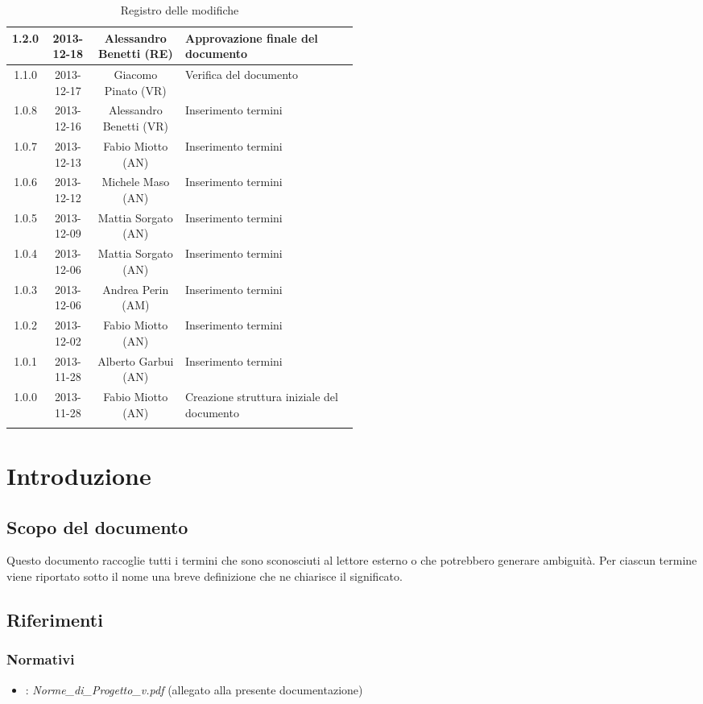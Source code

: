 \begin{center}
\begin{longtable}{|c|c|c|p{0.5\linewidth}|}
\midrule
1.2.0 & 2013-12-18 & Alessandro Benetti (RE) & Approvazione finale del documento\\
\midrule
1.1.0 & 2013-12-17 & Giacomo Pinato (VR) & Verifica del documento \\
\midrule
1.0.8 & 2013-12-16 & Alessandro Benetti (VR) & Inserimento termini\\
\midrule
1.0.7 & 2013-12-13 & Fabio Miotto (AN) & Inserimento termini\\
\midrule
1.0.6 & 2013-12-12 & Michele Maso (AN) & Inserimento termini\\
\midrule
1.0.5 & 2013-12-09 & Mattia Sorgato (AN) & Inserimento termini\\
\midrule
1.0.4 & 2013-12-06 & Mattia Sorgato (AN) & Inserimento termini \\
\midrule
1.0.3 & 2013-12-06 & Andrea Perin (AM) & Inserimento termini\\
\midrule
1.0.2 & 2013-12-02 & Fabio Miotto (AN) & Inserimento termini\\
\midrule
1.0.1 & 2013-11-28 & Alberto Garbui (AN) & Inserimento termini\\
\midrule
1.0.0 & 2013-11-28 & Fabio Miotto (AN) & Creazione struttura iniziale del documento\\


\bottomrule
\caption{Registro delle modifiche}
\label{tab:changelog}
\end{longtable}
\end{center}


\newpage
\section{Introduzione}%
\label{1.0}
\subsection{Scopo del documento}%
\label{1.1}
Questo documento raccoglie tutti i termini che sono sconosciuti al lettore esterno o che potrebbero generare ambiguità. Per ciascun termine viene riportato sotto il nome una breve definizione che ne chiarisce il significato.
\subsection{Riferimenti} %
\label{1.4}
\subsubsection{Normativi} %
\label{1.4.1}
\begin{itemize}
\item {}: \emph{Norme\_{}di\_{}Progetto\_{}v\versioneNormeDiProgetto{}.pdf}  (allegato alla presente documentazione)\\
\end{itemize}
